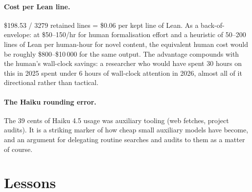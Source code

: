 \documentclass[11pt]{article}
\begin{document}
\paragraph{Cost per Lean line.} \$198.53 / 3279 retained lines = \$0.06
per kept line of Lean. As a back-of-envelope: at \$50--150/hr for human
formalisation effort and a heuristic of 50--200 lines of Lean per
human-hour for novel content, the equivalent human cost would be
roughly \$800--\$10\,000 for the same output. The advantage compounds
with the human's wall-clock savings: a researcher who would have spent
30 hours on this in 2025 spent under 6 hours of wall-clock attention in
2026, almost all of it directional rather than tactical.

\paragraph{The Haiku rounding error.} The 39 cents of Haiku 4.5 usage was
auxiliary tooling (web fetches, project audits). It is a striking marker
of how cheap small auxiliary models have become, and an argument for
delegating routine searches and audits to them as a matter of course.

\section{Lessons}
\end{document}
